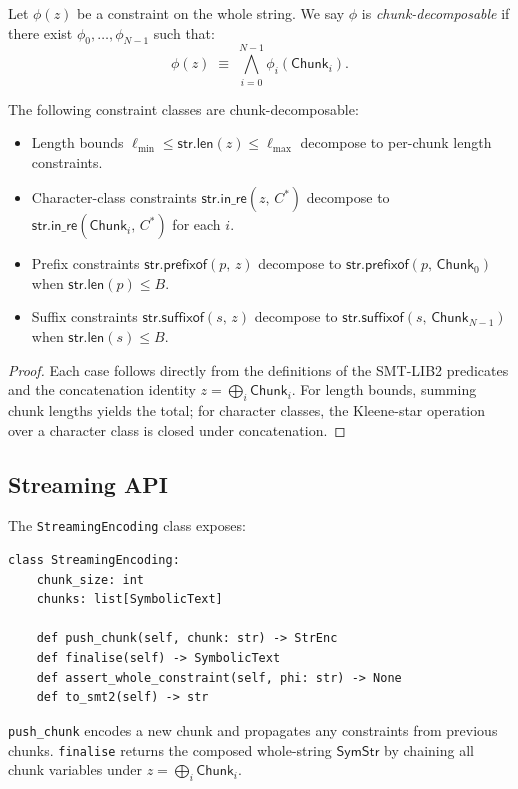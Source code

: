 \documentclass[11pt]{article}
\newcommand{\SymStr}{\ensuremath{\mathsf{SymStr}}}
\newcommand{\strlen}[1]{\ensuremath{\mathsf{str.len}(#1)}}
\newcommand{\strpre}[2]{\ensuremath{\mathsf{str.prefixof}(#1,\,#2)}}
\newcommand{\strsuf}[2]{\ensuremath{\mathsf{str.suffixof}(#1,\,#2)}}
\newcommand{\strinre}[2]{\ensuremath{\mathsf{str.in\_re}(#1,\,#2)}}
\newcommand{\Chunk}{\ensuremath{\mathsf{Chunk}}}
\newcommand{\restar}[1]{\ensuremath{#1^{*}}}
\newcommand{\bigcat}{\ensuremath{\bigoplus}}
\begin{document}
Let $\phi(z)$ be a constraint on the whole string.  We say $\phi$ is
\emph{chunk-decomposable} if there exist $\phi_0, \ldots, \phi_{N-1}$ such
that:
\[
  \phi(z) \;\equiv\; \bigwedge_{i=0}^{N-1} \phi_i(\Chunk_i).
\]

\begin{proposition}
\label{prop:chunk}
The following constraint classes are chunk-decomposable:
\begin{itemize}
  \item Length bounds $\ell_{\min} \leq \strlen{z} \leq \ell_{\max}$
    decompose to per-chunk length constraints.
  \item Character-class constraints $\strinre{z}{\restar{C}}$ decompose to
    $\strinre{\Chunk_i}{\restar{C}}$ for each $i$.
  \item Prefix constraints $\strpre{p}{z}$ decompose to
    $\strpre{p}{\Chunk_0}$ when $\strlen{p} \leq B$.
  \item Suffix constraints $\strsuf{s}{z}$ decompose to
    $\strsuf{s}{\Chunk_{N-1}}$ when $\strlen{s} \leq B$.
\end{itemize}
\end{proposition}

\begin{proof}
Each case follows directly from the definitions of the SMT-LIB2 predicates
and the concatenation identity $z = \bigcat_i \Chunk_i$.  For length bounds,
summing chunk lengths yields the total; for character classes, the Kleene-star
operation over a character class is closed under concatenation.
\end{proof}

\subsection{Streaming API}
\label{sec:streaming-api}

The \texttt{StreamingEncoding} class exposes:
\begin{lstlisting}[style=jugeo-python]
class StreamingEncoding:
    chunk_size: int
    chunks: list[SymbolicText]

    def push_chunk(self, chunk: str) -> StrEnc
    def finalise(self) -> SymbolicText
    def assert_whole_constraint(self, phi: str) -> None
    def to_smt2(self) -> str
\end{lstlisting}

\texttt{push\_chunk} encodes a new chunk and propagates any constraints from
previous chunks.  \texttt{finalise} returns the composed whole-string
\SymStr{} by chaining all chunk variables under
$z = \bigcat_i \Chunk_i$.
\end{document}
